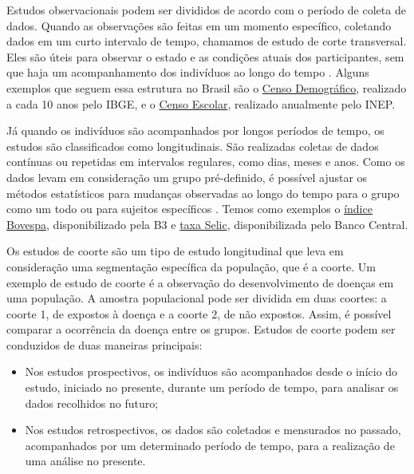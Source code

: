 Estudos observacionais podem ser divididos de acordo com o período de coleta de dados. Quando as observações são feitas em um momento específico, coletando dados em um curto intervalo de tempo, chamamos de estudo de corte transversal. Eles são úteis para observar o estado e as condições atuais dos participantes, sem que haja um acompanhamento dos indivíduos ao longo do tempo \autocite{Zangirolami-Raimundo2018}. Alguns exemplos que seguem essa estrutura no Brasil são o \href{https://www.ibge.gov.br/estatisticas/sociais/trabalho/22827-censo-demografico-2022.html?=&t=o-que-e}{Censo Demográfico}, realizado a cada 10 anos pelo IBGE, e o \href{https://www.gov.br/inep/pt-br/areas-de-atuacao/pesquisas-estatisticas-e-indicadores/censo-escolar}{Censo Escolar}, realizado anualmente pelo INEP. 

Já quando os indivíduos são acompanhados por longos períodos de tempo, os estudos são classificados como longitudinais. São realizadas coletas de dados contínuas ou repetidas em intervalos regulares, como dias, meses e anos. Como os dados levam em consideração um grupo pré-definido, é possível ajustar os métodos estatísticos para mudanças observadas ao longo do tempo para o grupo como um todo ou para sujeitos específicos \autocite{Caruana2015}. Temos como exemplos o \href{https://www.b3.com.br/pt_br/market-data-e-indices/indices/indices-amplos/ibovespa.htm}{índice Bovespa}, disponibilizado pela B3 e \href{https://www.bcb.gov.br/controleinflacao/taxaselic}{taxa Selic}, disponibilizada pelo Banco Central.

Os estudos de coorte são um tipo de estudo longitudinal que leva em consideração uma segmentação específica da população, que é a coorte. Um exemplo de estudo de coorte é a observação do desenvolvimento de doenças em uma população. A amostra populacional pode ser dividida em duas coortes: a coorte 1, de expostos à doença e a coorte 2, de não expostos. Assim, é possível comparar a ocorrência da doença entre os grupos. Estudos de coorte podem ser conduzidos de duas maneiras principais: 

\begin{itemize}
  \item Nos estudos prospectivos, os indivíduos são acompanhados desde o início do estudo, iniciado no presente, durante um período de tempo, para analisar os dados recolhidos no futuro;
  \item Nos estudos retrospectivos, os dados são coletados e mensurados no passado, acompanhados por um determinado período de tempo, para a realização de uma análise no presente.
\end{itemize}

